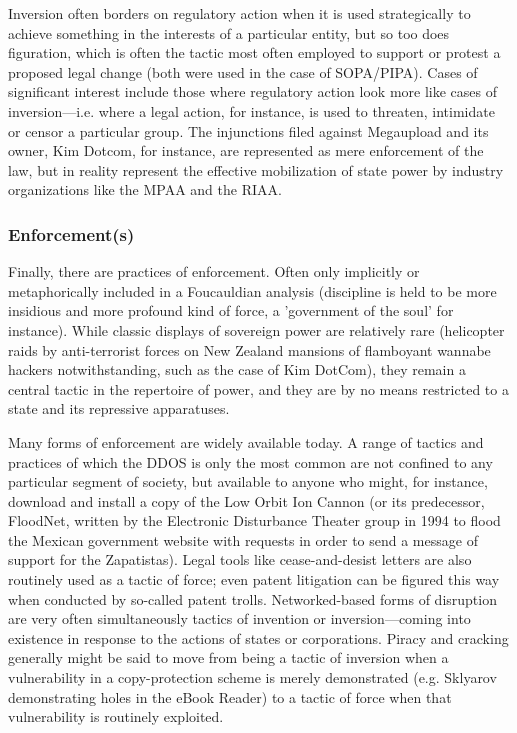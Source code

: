 \documentclass[10pt,letter,oneside]{scrartcl}
\begin{document}
Inversion often borders on regulatory action when it is used strategically to
achieve something in the interests of a particular entity, but so too does
figuration, which is often the tactic most often employed to support or protest
a proposed legal change (both were used in the case of SOPA/PIPA).  Cases of
significant interest include those where regulatory action look more like cases
of inversion---i.e. where a legal action, for instance, is used to threaten,
intimidate or censor a particular group. The injunctions filed against
Megaupload and its owner, Kim Dotcom, for instance, are represented as mere 
enforcement of the law, but in reality represent the effective mobilization 
of state power by industry organizations like the MPAA and the RIAA.

\subsubsection{Enforcement(s)}

Finally, there are practices of enforcement. Often only implicitly or
metaphorically included in a Foucauldian analysis (discipline is held to be
more insidious and more profound kind of force, a 'government of the soul' for
instance).  While classic displays of sovereign power are relatively rare
(helicopter raids by anti-terrorist forces on New Zealand mansions of
flamboyant wannabe hackers notwithstanding, such as the case of Kim DotCom), 
they remain a central tactic in the repertoire of power, and they are by no means
restricted to a state and its repressive apparatuses.

Many forms of enforcement are widely available today.  A range of tactics and
practices of which the DDOS is only the most common are not confined to any
particular segment of society, but available to anyone who might, for instance,
download and install a copy of the Low Orbit Ion Cannon (or its predecessor,
FloodNet, written by the Electronic Disturbance Theater group in 1994 to 
flood the Mexican government website with requests in order to send a message
of support for the Zapatistas).  Legal tools like cease-and-desist letters are 
also routinely used as a tactic of force; even patent litigation can be figured 
this way when conducted by so-called patent trolls.  Networked-based forms of 
disruption are very often simultaneously tactics of invention or inversion—coming 
into existence in response to the actions of states or corporations.  Piracy and 
cracking generally might be said to move from being a tactic of inversion when a vulnerability in a copy-protection scheme is merely demonstrated (e.g. Sklyarov demonstrating holes in the eBook Reader) to a tactic of force when that 
vulnerability is routinely exploited.
\end{document}
